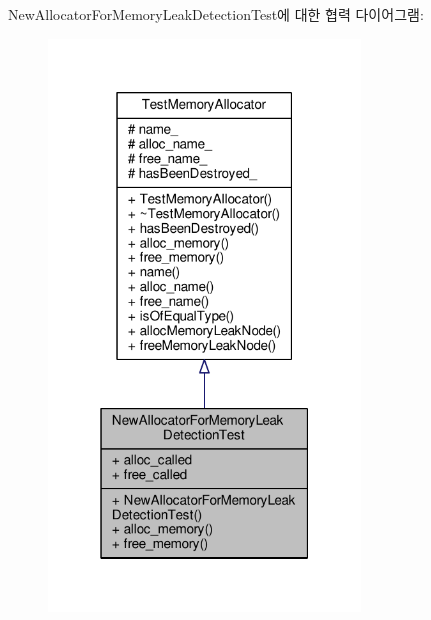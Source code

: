 New\+Allocator\+For\+Memory\+Leak\+Detection\+Test에 대한 협력 다이어그램\+:
\nopagebreak
\begin{figure}[H]
\begin{center}
\leavevmode
\includegraphics[width=235pt]{class_new_allocator_for_memory_leak_detection_test__coll__graph}
\end{center}
\end{figure}
